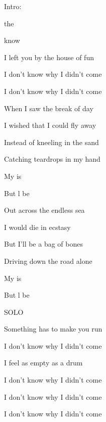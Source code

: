 
\zs
Intro:           
\ks

\zs
{}  the  

 know   

I left you by the house of fun

I don't know why I didn't come

I don't know why I didn't come
\ks

\zs
When I saw the break of day

I wished that I could fly away

Instead of kneeling in the sand

Catching teardrops in my hand
\ks

\zr
My  is   

But l be  
        
\kr

\zs
Out       across the endless sea

I would die in ecstasy

But I'll     be a bag of bones

Driving down the road alone
\ks

\zr
My  is   

But l be  
        
\kr

\zs
SOLO
\ks

\zs
Something has to make you run

I don't know why I didn't come

I feel as empty as a drum

I don't know why I didn't come

I don't know why I didn't come

I don't know why I didn't come
\ks

\kp